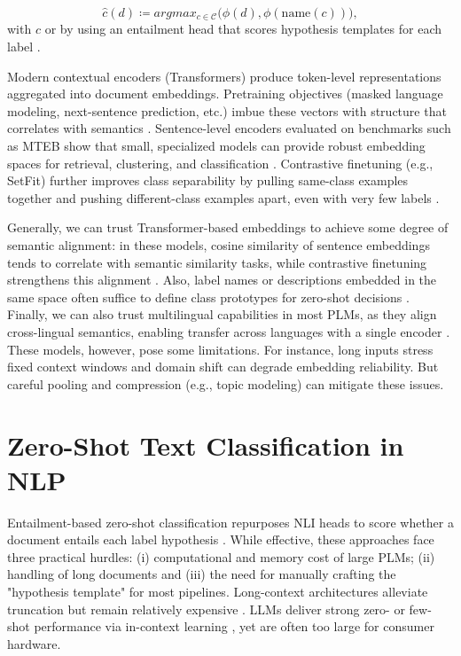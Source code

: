 \documentclass[]{politex-xico}
\begin{document}
\begin{equation}
    \hat{c}(d) \coloneqq
argmax_{c \in \mathcal{C}}
\bigl(\phi(d), \phi(\text{name}(c))\bigr),
\end{equation}
with $c$ 
or by using an entailment head that scores hypothesis templates for each label \cite{yin2019benchmarking}.

Modern contextual encoders (Transformers) produce token-level representations aggregated into document embeddings. Pretraining objectives (masked language modeling, next-sentence prediction, etc.) imbue these vectors with structure that correlates with semantics \cite{BERT,liu2019roberta,attentionallyouneed}. Sentence-level encoders evaluated on benchmarks such as MTEB \cite{muennighoff2023mteb} show that small, specialized models can provide robust embedding spaces for retrieval, clustering, and classification \cite{lee2024nvembed,duquenne2023sonar}. Contrastive finetuning (e.g., SetFit) further improves class separability by pulling same-class examples together and pushing different-class examples apart, even with very few labels \cite{setfit}.

Generally, we can trust Transformer-based embeddings to achieve some degree of semantic alignment: in these models, cosine similarity of sentence embeddings tends to correlate with semantic similarity tasks, while contrastive finetuning strengthens this alignment \cite{setfit,muennighoff2023mteb}. Also, label names or descriptions embedded in the same space often suffice to define class prototypes for zero-shot decisions \cite{yin2019benchmarking}.
Finally, we can also trust multilingual capabilities in most PLMs, as they align cross-lingual semantics, enabling transfer across languages with a single encoder \cite{multilingualbert,DBLP:journals/corr/abs-1911-02116,conneau2020unsupervised}.
These models, however, pose some limitations. For instance, long inputs stress fixed context windows \cite{beltagy2020longformer,Zaheer2020BigBT} and domain shift can degrade embedding reliability. But careful pooling and compression (e.g., topic modeling) can mitigate these issues.

\section{Zero-Shot Text Classification in NLP}
\label{sec:zs_tc}

Entailment-based zero-shot classification repurposes NLI heads to score whether a document entails each label hypothesis \cite{yin2019benchmarking,williams2018broad,conneau2018xnli}. While effective, these approaches face three practical hurdles: (i) computational and memory cost of large PLMs; (ii) handling of long documents and (iii) the need for manually crafting the "hypothesis template" for most pipelines. Long-context architectures alleviate truncation but remain relatively expensive \cite{beltagy2020longformer,Zaheer2020BigBT}. LLMs deliver strong zero- or few-shot performance via in-context learning \cite{brown2020language,chan2022data}, yet are often too large for consumer hardware.
\end{document}
